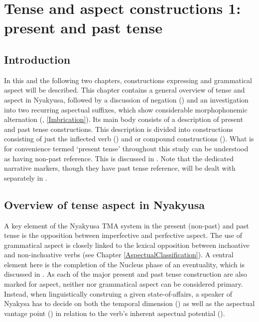 \chapter{Tense and aspect constructions 1: present and past tense}\label{TenseAspectConstructions}
\largerpage
\section{Introduction}%
In this and the following two chapters, constructions expressing  and grammatical aspect will be described. This chapter contains a general overview of tense and aspect in Nyakyusa, followed by a discussion of negation () and an investigation into two recurring aspectual suffixes, which show considerable morphophonemic alternation (, \ref{Imbrication}). Its main body consists of a description of present and past tense constructions. This description is divided into constructions consisting of just the inflected verb () and  or compound constructions (). What is for convenience termed \lq present tense' throughout this study can be understood as having non-past reference. This is discussed in . Note that the dedicated narrative markers, though they have past tense reference, will be dealt with separately in .

\section{Overview of tense aspect in Nyakyusa}
A key element of the Nyakyusa TMA system in the present (non-past) and past tense is the opposition between imperfective and perfective aspect. The use of grammatical aspect is closely linked to the lexical opposition between inchoative and non-inchoative verbs (see Chapter \ref{AspectualClassification}). A central element here is the completion of the Nucleus phase of an eventuality, which is discussed in .  As each of the major present and past tense construction are also marked for aspect, neither  nor grammatical aspect can be considered primary. Instead, when linguistically construing  a given state-of-affairs, a speaker of Nyakysa has to decide on both the temporal dimension () as well as the aspectual vantage point () in relation to the verb's inherent aspectual potential ().

